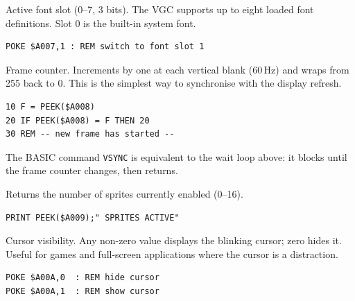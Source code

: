 
Active font slot (0--7, 3 bits).  The VGC supports up to eight loaded font
definitions.  Slot 0 is the built-in system font.

\begin{lstlisting}
POKE $A007,1 : REM switch to font slot 1
\end{lstlisting}



Frame counter.  Increments by one at each vertical blank (60\,Hz) and wraps
from 255 back to 0.  This is the simplest way to synchronise with the display
refresh.

\begin{lstlisting}
10 F = PEEK($A008)
20 IF PEEK($A008) = F THEN 20
30 REM -- new frame has started --
\end{lstlisting}

\begin{tipbox}
The BASIC command \texttt{VSYNC} is equivalent to the wait loop above: it
blocks until the frame counter changes, then returns.
\end{tipbox}



Returns the number of sprites currently enabled (0--16).

\begin{lstlisting}
PRINT PEEK($A009);" SPRITES ACTIVE"
\end{lstlisting}



Cursor visibility.  Any non-zero value displays the blinking cursor; zero
hides it.  Useful for games and full-screen applications where the cursor is
a distraction.

\begin{lstlisting}
POKE $A00A,0  : REM hide cursor
POKE $A00A,1  : REM show cursor
\end{lstlisting}



